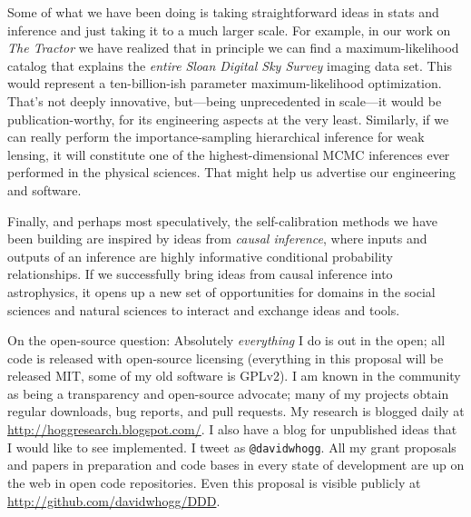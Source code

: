 \documentclass[11pt, letterpaper]{article}
\begin{document}
Some of what we have been doing is taking straightforward ideas in
stats and inference and just taking it to a much larger scale.
For example, in our work on \textsl{The Tractor} we have realized that
in principle we can find a maximum-likelihood catalog that explains
the \emph{entire} \textsl{Sloan Digital Sky Survey} imaging data set.
This would represent a ten-billion-ish parameter maximum-likelihood
optimization.
That's not deeply innovative, but---being unprecedented in
scale---it
would be publication-worthy, for its engineering aspects at the very
least.
Similarly, if we can really perform the importance-sampling
hierarchical inference for weak lensing, it will constitute one of the
highest-dimensional MCMC inferences ever performed in the physical
sciences.
That might help us advertise our engineering and software.

Finally, and perhaps most speculatively, the self-calibration methods
we have been building are inspired by ideas from \emph{causal
  inference}, where inputs and outputs of an inference are highly
informative conditional probability relationships.
If we successfully bring ideas from causal inference into
astrophysics, it opens up a new set of opportunities for domains in
the social sciences and natural sciences to interact and exchange
ideas and tools.

On the open-source question:
Absolutely \emph{everything} I do is out in the open; all code is released
with open-source licensing (everything in this proposal will be
released MIT, some of my old software is GPLv2).
I am known in the community as being a transparency and
open-source advocate; many of my projects obtain regular downloads,
bug reports, and pull requests.
My research is blogged daily at
\url{http://hoggresearch.blogspot.com/}.
I also have a blog for unpublished ideas that I would like to see
implemented.
I tweet as \texttt{@davidwhogg}.
All my grant proposals and papers in preparation and code bases in
every state of development are up on the web in open code
repositories.
Even this proposal is visible publicly at
\url{http://github.com/davidwhogg/DDD}.
\end{document}
